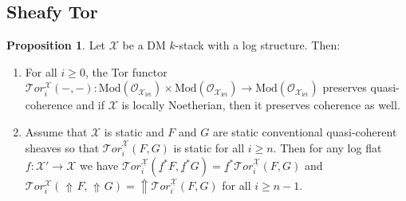 \documentclass[11pt]{amsart}
\theoremstyle{definition}
\theoremstyle{definition}
\newtheorem{proposition}[theorem]{Proposition}
\DeclareMathOperator{\arrowup}{\!\Uparrow \!}
\newcommand{\cX}{\mathcal{X}}
\newcommand{\LogO}[1]{\mathcal{O}_{{#1}_\text{l\'et}}}
\newcommand{\cal}{\mathcal}
\def\cX{{\cal X}}
\begin{document}
\subsection{Sheafy Tor}
\begin{proposition}\label{prop: tor}
    Let $\mathcal{X}$ be a DM $k$-stack with a log structure. Then:
    \begin{enumerate}
        \item\label{item: Tor preserves quasi-coherence} For all $i\geq 0$, the Tor functor $\mathcal{T}or_i^{\cX}(-,-)\colon \text{Mod}(\LogO{\mathcal{X}})\times\text{Mod}(\LogO{\mathcal{X}})\rightarrow \text{Mod}(\LogO{\mathcal{X}})$ preserves quasi-coherence and if $\mathcal{X}$ is locally Noetherian, then it preserves coherence as well.
        \item\label{item: compute Tor} Assume that $\mathcal{X}$ is static and $F$ and $G$ are static conventional quasi-coherent sheaves so that $\mathcal{T}or_i^{\underline{\cX}}(F,G)$ is static for all $i\geq n$. Then for any log flat $f\colon \mathcal{X}'\rightarrow \mathcal{X}$ we have $\mathcal{T}or_i^{\underline{\cX}}(\underline{f}^* F,\underline{f}^* G) = \underline{f}^*\mathcal{T}or_i^{\underline{\cX}}(F,G)$ and $\mathcal{T}or_i^{\cX}(\arrowup F,\arrowup G) = \Uparrow\!\!\mathcal{T}or_i^{\underline{\cX}}(F,G)$ for all $i\geq n-1$. 
    \end{enumerate}
\end{proposition}
\end{document}
